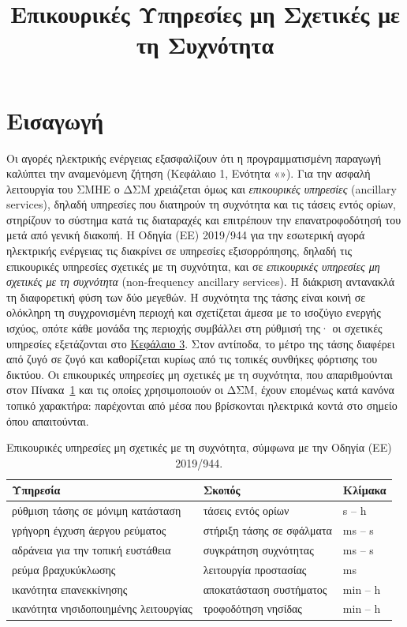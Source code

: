 \title{Επικουρικές Υπηρεσίες μη Σχετικές με τη Συχνότητα}

\section{Εισαγωγή}
\label{kef-02-theoria}
Οι αγορές ηλεκτρικής ενέργειας εξασφαλίζουν ότι η προγραμματισμένη παραγωγή καλύπτει την
αναμενόμενη ζήτηση (Κεφάλαιο 1, Ενότητα «»). Για την ασφαλή λειτουργία του
ΣΜΗΕ ο ΔΣΜ χρειάζεται όμως και \emph{επικουρικές υπηρεσίες} (ancillary services), δηλαδή
υπηρεσίες που διατηρούν τη συχνότητα και τις τάσεις εντός ορίων, στηρίζουν το σύστημα κατά τις
διαταραχές και επιτρέπουν την επανατροφοδότησή του μετά από γενική διακοπή. Η Οδηγία (ΕΕ)
2019/944 για την εσωτερική αγορά ηλεκτρικής ενέργειας τις διακρίνει σε υπηρεσίες εξισορρόπησης,
δηλαδή τις επικουρικές υπηρεσίες σχετικές με τη συχνότητα, και σε \emph{επικουρικές υπηρεσίες
μη σχετικές με τη συχνότητα} (non-frequency ancillary services). Η διάκριση αντανακλά τη
διαφορετική φύση των δύο μεγεθών. Η συχνότητα της τάσης είναι κοινή σε ολόκληρη τη
συγχρονισμένη περιοχή και σχετίζεται άμεσα με το ισοζύγιο ενεργής ισχύος, οπότε κάθε μονάδα της
περιοχής συμβάλλει στη ρύθμισή της· οι σχετικές υπηρεσίες εξετάζονται στο
\hyperref[kef-03-theoria]{Κεφάλαιο 3}. Στον αντίποδα, το μέτρο της τάσης διαφέρει από ζυγό σε
ζυγό και καθορίζεται κυρίως από τις τοπικές συνθήκες φόρτισης του δικτύου. Οι επικουρικές
υπηρεσίες μη σχετικές με τη συχνότητα, που απαριθμούνται στον Πίνακα~\ref{tab:nfas} και τις
οποίες χρησιμοποιούν οι ΔΣΜ, έχουν επομένως κατά κανόνα τοπικό χαρακτήρα: παρέχονται από μέσα
που βρίσκονται ηλεκτρικά κοντά στο σημείο όπου απαιτούνται.

\begin{table}[!htbp]
\centering
\begin{tabular}{lll}
\hline
Υπηρεσία & Σκοπός & Κλίμακα \\
\hline
ρύθμιση τάσης σε μόνιμη κατάσταση & τάσεις εντός ορίων & s -- h \\
γρήγορη έγχυση άεργου ρεύματος & στήριξη τάσης σε σφάλματα & ms -- s \\
αδράνεια για την τοπική ευστάθεια & συγκράτηση συχνότητας & ms -- s \\
ρεύμα βραχυκύκλωσης & λειτουργία προστασίας & ms \\
ικανότητα επανεκκίνησης & αποκατάσταση συστήματος & min -- h \\
ικανότητα νησιδοποιημένης λειτουργίας & τροφοδότηση νησίδας & min -- h \\
\hline
\end{tabular}
\caption{Επικουρικές υπηρεσίες μη σχετικές με τη συχνότητα, σύμφωνα με την Οδηγία (ΕΕ)
2019/944.}
\label{tab:nfas}
\end{table}

